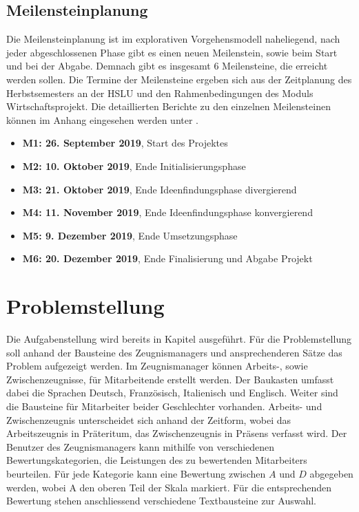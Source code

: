 \subsection{Meilensteinplanung}
\label{sec:Meilensteinplanung}
Die Meilensteinplanung ist im explorativen Vorgehensmodell naheliegend, nach jeder abgeschlossenen Phase gibt es einen
neuen Meilenstein, sowie beim Start und bei der Abgabe. Demnach gibt es insgesamt $ 6 $ Meilensteine, die erreicht
werden sollen. Die Termine der Meilensteine ergeben sich aus der Zeitplanung des Herbstsemesters an der HSLU und den
Rahmenbedingungen des Moduls \flqq Wirtschaftsprojekt\frqq. Die detaillierten Berichte zu den einzelnen Meilensteinen
können im Anhang eingesehen werden unter .
\begin{itemize}
	\setlength\itemsep{0em}
	\item \textbf{M1: 26. September 2019}, Start des Projektes
	\item \textbf{M2: 10. Oktober 2019}, Ende Initialisierungsphase
	\item \textbf{M3: 21. Oktober 2019}, Ende Ideenfindungsphase divergierend
	\item \textbf{M4: 11. November 2019}, Ende Ideenfindungsphase konvergierend
	\item \textbf{M5: 9. Dezember 2019}, Ende Umsetzungsphase
	\item \textbf{M6: 20. Dezember 2019}, Ende Finalisierung und Abgabe Projekt
\end{itemize}

\section{Problemstellung}
\label{sec:Problemstellung}
Die Aufgabenstellung wird bereits in Kapitel  ausgeführt. Für die
Problemstellung soll anhand der Bausteine des Zeugnismanagers und ansprechenderen Sätze das Problem aufgezeigt werden. 
\newline
\newline
Im Zeugnismanager können Arbeits-, sowie Zwischenzeugnisse, für Mitarbeitende erstellt werden. Der Baukasten umfasst
dabei die Sprachen Deutsch, Französisch, Italienisch und Englisch. Weiter sind die Bausteine für Mitarbeiter beider
Geschlechter vorhanden. Arbeits- und Zwischenzeugnis unterscheidet sich anhand der Zeitform, wobei das Arbeitszeugnis in
Präteritum, das Zwischenzeugnis in Präsens verfasst wird.
\newline
\newline
Der Benutzer des Zeugnismanagers kann mithilfe von verschiedenen Bewertungskategorien, die Leistungen des zu bewertenden
Mitarbeiters beurteilen. Für jede Kategorie kann eine Bewertung zwischen $A$ und $D$ abgegeben werden, wobei A den oberen
Teil der Skala markiert. Für die entsprechenden Bewertung stehen anschliessend verschiedene Textbausteine zur Auswahl.

